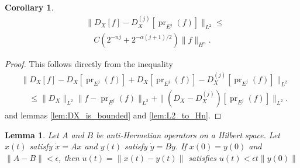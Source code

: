 \documentclass[letterpaper, 10 pt, conference]{ieeeconf}
\newtheorem{cor}[thm]{Corollary}
\newtheorem{lem}[thm]{Lemma}
\DeclareMathOperator{\pr}{pr}
\begin{document}
  \begin{cor} \label{cor:operator_bound}
    \begin{align*}
      &\| D_X [f] - D_X^{(j)} [\pr_{E^j}(f)] \|_{L^2} \leq \\
      &\quad C \left( 2^{-nj} + 2^{-\alpha(j+1)/2} \right) \|f\|_{H^n}.
    \end{align*}
  \end{cor}
  \begin{proof}
    This follows directly from the inequality
    \begin{align*}
      &\| D_X [f] - D_X[\pr_{E^j}(f)] + D_X[\pr_{E^j}(f)] - D_X^{(j)}[\pr_{E^j}(f)] \|_{L^2} \\
      &\quad \leq \|D_X\|_{L^2} \| f - \pr_{E^j}(f)\|_{L^2}
      + \| (D_X - D_X^{(j)}) [\pr_{E^j}(f)] \|_{L^2}.
    \end{align*}
    and lemmas \ref{lem:DX_is_bounded} and \ref{lem:L2_to_Hn}.
  \end{proof}

  \begin{lem} \label{lem:flow_bound}
    Let $A$ and $B$ be anti-Hermetian operators on a Hilbert space.
    Let $x(t)$ satisfy $\dot{x} = Ax$ and $y(t)$ satisfy $\dot{y} = By$.
    If $x(0) = y(0)$ and $\| A - B \| < \epsilon$, then $u(t) = \| x(t) - y(t) \|$ satisfies $u(t) < \epsilon t \| y(0) \|$
  \end{lem}
 
\end{document}
